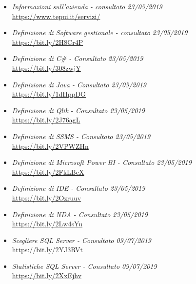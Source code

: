 \begin{itemize}
	\item \textit{Informazioni sull'azienda - consultato 23/05/2019}\\
	\url{https://www.tepui.it/servizi/}
	
	\item \textit{Definizione di Software gestionale - consultato 23/05/2019}\\
	\url{https://bit.ly/2H8Cr4P}
	
	\item \textit{Definizione di C\# - Consultato 23/05/2019}\\
	\url{https://bit.ly/308zwjY}
	
	\item \textit{Definizione di Java - Consultato 23/05/2019}\\
	\url{https://bit.ly/1dHppDG} 
	
	\item \textit{Definizione di Qlik - Consultato 23/05/2019}\\
	\url{https://bit.ly/2J76agL} 
	
	\item \textit{Definizione di SSMS - Consultato 23/05/2019}\\
	\url{https://bit.ly/2VPWZHn} 
	
	\item \textit{Definizione di Microsoft Power BI - Consultato 23/05/2019}\\
	\url{https://bit.ly/2FkLBeX}
	
	\item \textit{Definizione di IDE - Consultato 23/05/2019}\\
	\url{https://bit.ly/2Ozruuv}
	
	\item \textit{Definizione di NDA - Consultato 23/05/2019}\\
	\url{https://bit.ly/2Lw4sYu}
	
	\item \textit{Scegliere SQL Server - Consultato 09/07/2019}\\
	\url{https://bit.ly/2YJ3RVt}
	
	\item \textit{Statistiche SQL Server - Consultato 09/07/2019}\\
	\url{https://bit.ly/2XxEjhv}
	
	
\end{itemize}





